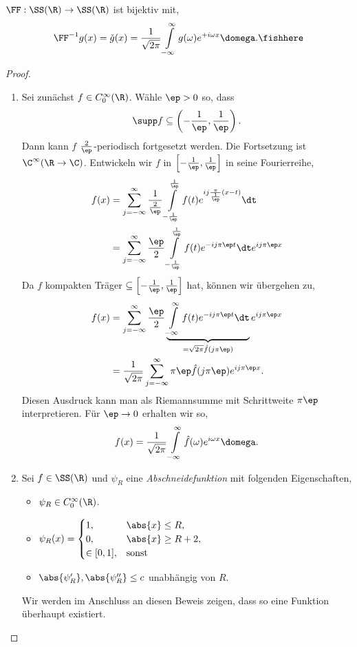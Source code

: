 \begin{prop}
\label{prop:2.11}
$\FF: \SS(\R)\to\SS(\R)$ ist bijektiv mit,
\begin{align*}
\FF^{-1}g(x) = \check{g}(x) = \frac{1}{\sqrt{2\pi}}\int\limits_{-\infty}^\infty
g(\omega)e^{+i\omega x}\domega.\fishhere
\end{align*}
\end{prop}
\begin{proof}
\begin{enumerate}[label=\arabic{*}.)]
  \item\label{proof:2.10:1} Sei zunächst $f\in C_0^\infty(\R)$. Wähle $\ep > 0$
  so, dass
\begin{align*}
\supp f \subseteq \left(-\frac{1}{\ep},\frac{1}{\ep}\right).
\end{align*}
Dann kann $f$ $\frac{2}{\ep}$-periodisch fortgesetzt werden. Die Fortsetzung
ist $\C^\infty(\R\to\C)$. Entwickeln wir $f$ in
$\left[-\frac{1}{\ep},\frac{1}{\ep}\right]$ in seine Fourierreihe,
\begin{align*}
f(x) &= \sum\limits_{j=-\infty}^\infty \frac{1}{\frac{2}{\ep}}
\int\limits_{-\frac{1}{\ep}}^{\frac{1}{\ep}}
f(t)e^{ij\frac{\pi}{\frac{1}{\ep}}(x-t)}\dt\\
&= \sum\limits_{j=-\infty}^\infty \frac{\ep}{2}
\int\limits_{-\frac{1}{\ep}}^{\frac{1}{\ep}}
f(t)e^{-ij\pi\ep t}\dt e^{ij\pi\ep x}
\end{align*}
Da $f$ kompakten Träger $\subseteq \left[-\frac{1}{\ep},\frac{1}{\ep}\right]$
hat, können wir übergehen zu,
\begin{align*}
f(x) &= \sum\limits_{j=-\infty}^\infty \frac{\ep}{2}
\underbrace{\int\limits_{-\infty}^{\infty}
f(t)e^{-ij\pi\ep t}\dt}_{=\sqrt{2\pi}\hat{f}(j\pi\ep)} e^{ij\pi\ep x}\\
&=\frac{1}{\sqrt{2\pi}}
\sum\limits_{j=-\infty}^\infty \pi\ep
\hat{f}(j\pi\ep)e^{ij\pi\ep x}.
\end{align*}
Diesen Ausdruck kann man als Riemannsumme mit Schrittweite
$\pi\ep$ interpretieren. Für $\ep\to 0$ erhalten wir so,
\begin{align*}
f(x) = \frac{1}{\sqrt{2\pi}}\int\limits_{-\infty}^\infty \hat{f}(\omega)
e^{i\omega x}\domega.
\end{align*}
\item Sei $f\in\SS(\R)$ und $\psi_R$ eine \emph{Abschneidefunktion} mit
folgenden Eigenschaften,
\begin{itemize}
  \item $\psi_R\in C_0^\infty(\R)$.
  \item $\psi_R(x) = \begin{cases}1, & \abs{x}\le R,\\ 0, & \abs{x}\ge R+2,\\
  \in[0,1], & \text{sonst}\end{cases}$
\item $\abs{\psi_R'}, \abs{\psi_R''} \le c$ unabhängig von $R$.
\end{itemize}
Wir werden im Anschluss an diesen Beweis zeigen, dass so eine Funktion überhaupt
existiert.


\end{enumerate}
\end{proof}
